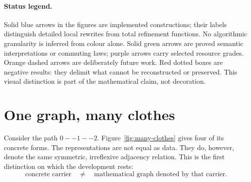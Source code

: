 \documentclass[11pt]{article}
\theoremstyle{remark}
\begin{document}
\begin{abstract}
The theory includes positive and negative examples for six ordinary graph
representations; exact refinement maps through a canonical matrix waist; the
first occurrence-level conversion GSLT; semantic machines for revision and
querying; a bridge to ordinary Mathlib
matrices; break-even theorems for migration and maintained multi-view
channels; worked query-centric, edge-centric, revision-heavy, and
space-constrained migration decisions; semantic queries for hypergraphs,
enriched metagraphs, and
distinction graphs; and transport of connectedness, bipartiteness, acyclicity,
degree, and Hamiltonicity.  Ore's and Dirac's theorems are proved over
Mathlib's graph semantics and then transported through every representation
conversion.  Raw native walk terms are characterized by unique dependent
Mathlib walks, preserving exact length and repeated-edge evidence.
A work-in-progress appendix marks the later arrows: detailed
matrix-to-row and row-to-CSR machines, walk cancellation and incremental
trail/path admission, an exact executable
syntax and elaborator, certified SAT/DQBF refinement, and a CeTTa runtime
realization.
The result is both a graph library and a worked
example of how a mathematical library can expose operational meaning without
confusing data layout, semantics, provenance, and cost.
\end{abstract}

\paragraph{Status legend.}
Solid blue arrows in the figures are implemented constructions; their labels
distinguish detailed local rewrites from total refinement functions.  No
algorithmic granularity is inferred from colour alone.  Solid green arrows are
proved semantic interpretations or commuting laws; purple arrows carry
selected resource grades.  Orange dashed arrows are deliberately future work.
Red dotted boxes are negative results: they delimit what cannot be
reconstructed or preserved.  This visual distinction is part of the
mathematical claim, not decoration.

\tableofcontents

\section{One graph, many clothes}
\label{sec:many-clothes}

Consider the path \(0--1--2\).  Figure~\ref{fig:many-clothes} gives four of
its concrete forms.  The representations are not equal as data.  They do,
however, denote the same symmetric, irreflexive adjacency relation.  This is
the first distinction on which the development rests:
\[
  \text{concrete carrier} \quad\neq\quad
  \text{mathematical graph denoted by that carrier}.
\]
\end{document}
